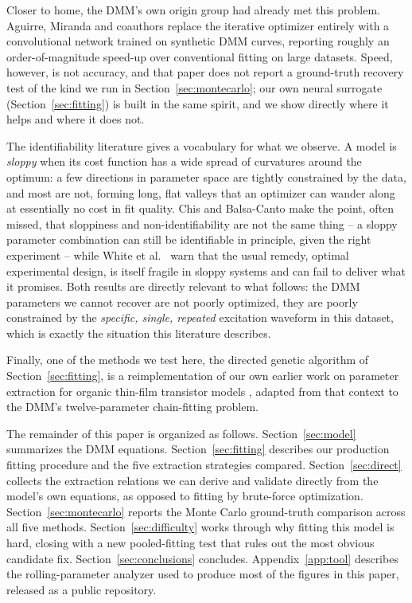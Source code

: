 \documentclass[11pt]{article}
\begin{document}
Closer to home, the DMM's own origin group had already met this problem.
Aguirre, Miranda and coauthors \cite{aguirre2022fast} replace the iterative
optimizer entirely with a convolutional network trained on synthetic DMM
curves, reporting roughly an order-of-magnitude speed-up over conventional
fitting on large datasets. Speed, however, is not accuracy, and that paper
does not report a ground-truth recovery test of the kind we run in
Section~\ref{sec:montecarlo}; our own neural surrogate (Section~\ref{sec:fitting})
is built in the same spirit, and we show directly where it helps and where
it does not.

The identifiability literature gives a vocabulary for what we observe.
A model is \emph{sloppy} when its cost function has a wide spread of
curvatures around the optimum: a few directions in parameter space are
tightly constrained by the data, and most are not, forming long, flat
valleys that an optimizer can wander along at essentially no cost in fit
quality. Chis and Balsa-Canto \cite{chis2014sloppy} make the point, often
missed, that sloppiness and non-identifiability are not the same thing --
a sloppy parameter combination can still be identifiable in principle, given
the right experiment -- while White et al.\ \cite{white2016limitations} warn
that the usual remedy, optimal experimental design, is itself fragile in
sloppy systems and can fail to deliver what it promises. Both results are
directly relevant to what follows: the DMM parameters we cannot recover are
not poorly optimized, they are poorly constrained by the \emph{specific,
single, repeated} excitation waveform in this dataset, which is exactly the
situation this literature describes.

Finally, one of the methods we test here, the directed genetic algorithm of
Section~\ref{sec:fitting}, is a reimplementation of our own earlier work on
parameter extraction for organic thin-film transistor models
\cite{garciamoreno2008directed}, adapted from that context to the DMM's
twelve-parameter chain-fitting problem.

The remainder of this paper is organized as follows. Section~\ref{sec:model}
summarizes the DMM equations. Section~\ref{sec:fitting} describes our
production fitting procedure and the five extraction strategies compared.
Section~\ref{sec:direct} collects the extraction relations we can derive
and validate directly from the model's own equations, as opposed to fitting
by brute-force optimization. Section~\ref{sec:montecarlo} reports the
Monte Carlo ground-truth comparison across all five methods.
Section~\ref{sec:difficulty} works through why fitting this model is hard,
closing with a new pooled-fitting test that rules out the most obvious
candidate fix. Section~\ref{sec:conclusions} concludes.
Appendix~\ref{app:tool} describes the rolling-parameter analyzer used to
produce most of the figures in this paper, released as a public repository.
\end{document}
